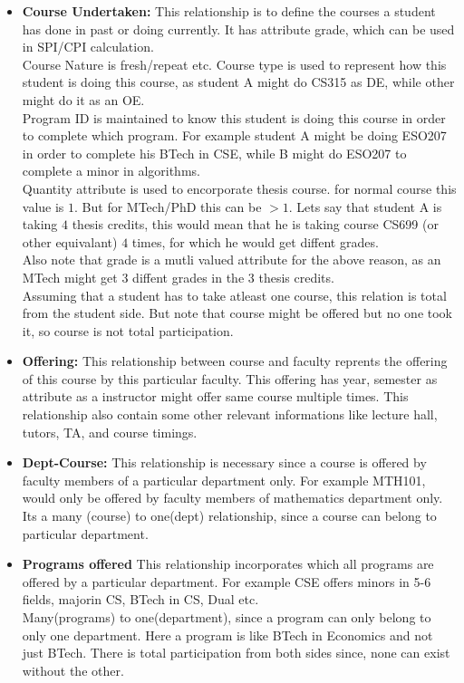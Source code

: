 \documentclass[a4paper]{article}
\begin{document}
\begin{itemize}
	\item{\textbf{Course Undertaken:}} This relationship is to define the courses a student has done
	in past or doing currently. It has attribute grade, which can be used in SPI/CPI calculation.\\
	Course Nature is fresh/repeat etc. Course type is used to represent how this student is doing this course,
	as student A might do CS315 as DE, while other might do it as an OE.\\
	Program ID is maintained to know this student is doing this course in order to complete which program.
	For example student A might be doing ESO207 in order to complete his BTech in CSE, while B might do
	ESO207 to complete a minor in algorithms. \\
	Quantity attribute is used to encorporate thesis course. for normal course this value is $1$.
	But for MTech/PhD this can be $>1$. Lets say that student A is taking $4$ thesis credits, this would mean
	that he is taking course CS699 (or other equivalant) $4$ times, for which he would get diffent grades. \\
	Also note that grade is a mutli valued attribute for the above reason, as an MTech might get 3 diffent
	grades in the 3 thesis credits. \\

	Assuming that a student has to take atleast one course, this relation is total from the student side.
	But note that course might be offered but no one took it, so course is not total participation. 

	\item{\textbf{Offering:}} This relationship between course and faculty reprents the offering of this
	course by this particular faculty. This offering has year, semester as attribute as a instructor might
	offer same course multiple times. This relationship also contain some other relevant informations like lecture hall,
	tutors, TA, and course timings. 

	\item{\textbf{Dept-Course:}} This relationship is necessary since a course is offered by faculty members
	of a particular department only. For example MTH101, would only be offered by faculty members of mathematics department only.
	\\
	Its a many (course) to one(dept) relationship, since a course can belong to particular department.


	\item{\textbf{Programs offered}} This relationship incorporates which all programs are offered by a
	particular department. For example CSE offers minors in 5-6 fields, majorin CS, BTech in CS, Dual etc.\\
	Many(programs) to one(department), since a program can only belong to only one department. Here a program is like BTech in Economics and not just BTech. There is total participation from both sides since, none can exist without the other.


\end{itemize}
\end{document}
